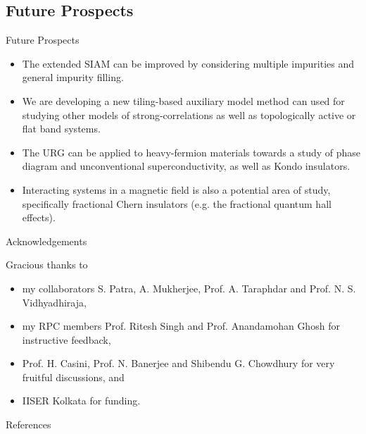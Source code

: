 \documentclass[8pt,aspectratio=169]{beamer}
\newcommand{\nitem}{\item[\ding{51}]}
\begin{document}
\begin{frame}{}
\section{Future Prospects}
\end{frame}

\begin{frame}{Future Prospects}
\begin{itemize}
	\nitem The extended SIAM can be improved by considering \alert{multiple impurities} and general impurity \alert{filling}.\\[20pt]
	\nitem We are developing a new \alert{tiling-based auxiliary model method} can used for studying other models of strong-correlations as well as topologically active or flat band systems.\\[20pt]
	\nitem The URG can be applied to \alert{heavy-fermion materials} towards a study of phase diagram and unconventional superconductivity, as well as Kondo insulators.\\[20pt]
	\nitem Interacting systems in a magnetic field is also a potential area of study, specifically \alert{fractional Chern insulators} (e.g. the fractional quantum hall effects).
\end{itemize}
\end{frame}


\begin{frame}{Acknowledgements}

\flushleft
Gracious thanks to\\[10pt]
\begin{itemize}
	\nitem my collaborators \alert{S. Patra, A. Mukherjee, Prof. A. Taraphdar} and \alert{Prof. N. S. Vidhyadhiraja},\\[10pt]
	\nitem my RPC members \alert{Prof. Ritesh Singh} and \alert{Prof. Anandamohan Ghosh} for instructive feedback,\\[10pt]
	\nitem \alert{Prof. H. Casini, Prof. N. Banerjee} and \alert{Shibendu G. Chowdhury} for very fruitful discussions, and\\[10pt]
	\nitem IISER Kolkata for funding.
\end{itemize}

\end{frame}

\appendix

\begin{frame}[allowframebreaks]{References}
\printbibliography[heading=none]
\end{frame}
\end{document}
